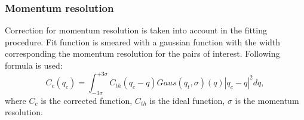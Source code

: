 \documentclass[ALICE,manyauthors]{ALICE_analysis_notes}
\begin{document}
\subsubsection{Momentum resolution}
Correction for momentum resolution is taken into account in the fitting procedure. Fit function is smeared with a gaussian function with the width corresponding the momentum resolution for the pairs of interest. Following formula is used:
\begin{equation}
  C_c(q_c) = \int_{-3\sigma}^{+3\sigma}C_{th}(q_c-q) Gaus(q_t, \sigma)(q) |q_c-q|^2 d q,
\end{equation}
where $C_c$ is the corrected function, $C_{th}$ is the ideal function, $\sigma$ is the momentum resolution.


\end{document}
